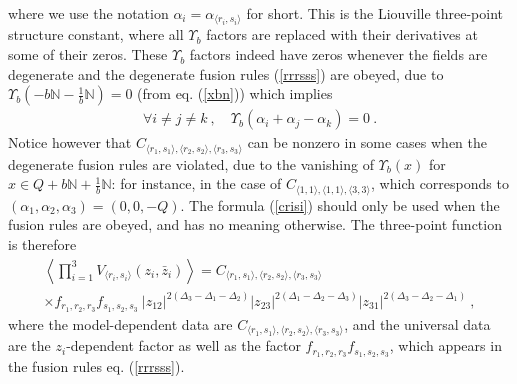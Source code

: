 \documentclass[12pt,a4paper,notitlepage]{report}
\newcommand \la {\left\langle}
\newcommand \ra {\right\rangle}
\newcommand \N {\mathbb{N}}
\numberwithin{equation}{section}
\theoremstyle{break}
\begin{document}
where we use the notation $\alpha_i = \alpha_{\langle r_i,s_i \rangle}$ for short. This is the Liouville three-point structure constant, where all $\Upsilon_b$ factors are replaced with their derivatives at some of their zeros. These $\Upsilon_b$ factors indeed have zeros whenever
the fields are degenerate and the degenerate fusion rules (\ref{rrrsss}) are obeyed, due to $\Upsilon_b(-b\N-\frac{1}{b}\N)=0$ (from eq. (\ref{xbn})) which implies 
\begin{align}
 \forall i\neq j\neq k\ , \quad \Upsilon_b(\alpha_i+\alpha_j-\alpha_k) = 0\ .
\end{align}
Notice however that $C_{\langle r_1,s_1\rangle ,\langle r_2,s_2\rangle ,\langle r_3,s_3 \rangle}$ can be nonzero in some cases when the degenerate fusion rules are violated, due to the vanishing of $\Upsilon_b(x)$ for $x\in Q+b\N+\frac{1}{b}\N$: for instance, in the case of $C_{\langle 1,1\rangle , \langle 1,1 \rangle,\langle 3,3 \rangle}$, which corresponds to $(\alpha_1,\alpha_2,\alpha_3)=(0,0,-Q)$. The formula (\ref{crisi}) should only be used when the fusion rules are obeyed, and has no meaning otherwise. The three-point function is therefore 
\begin{multline}
 \la \prod_{i=1}^3 V_{\langle r_i,s_i \rangle}(z_i,\bar{z}_i) \ra = C_{\langle r_1,s_1\rangle ,\langle r_2,s_2\rangle ,\langle r_3,s_3 \rangle}  
\\ \times 
f_{r_1,r_2,r_3} f_{s_1,s_2,s_3}\ |z_{12}|^{2(\Delta_3-\Delta_1-\Delta_2)} |z_{23}|^{2(\Delta_1-\Delta_2-\Delta_3)} |z_{31}|^{2(\Delta_3-\Delta_2-\Delta_1)}\ ,
\end{multline}
where 
the model-dependent data are $C_{\langle r_1,s_1\rangle ,\langle r_2,s_2\rangle ,\langle r_3,s_3 \rangle}$, and the universal data are the $z_i$-dependent factor as well as the factor $f_{r_1,r_2,r_3} f_{s_1,s_2,s_3}$, which appears in the fusion rules eq. (\ref{rrrsss}). 
\end{document}
